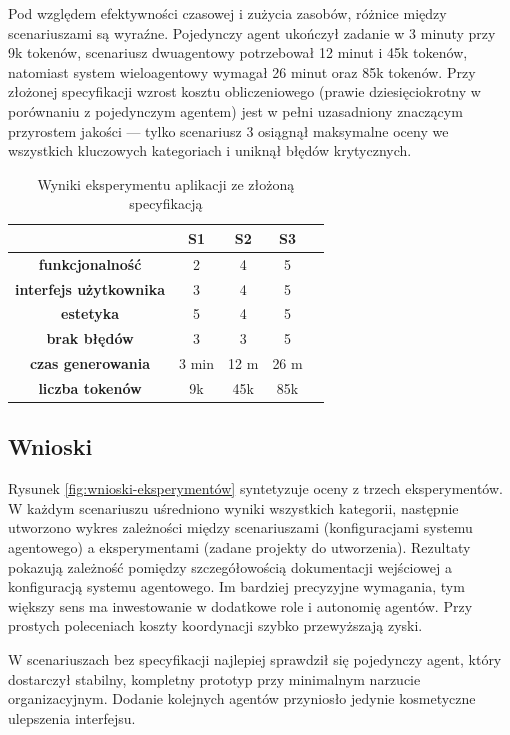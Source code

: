 Pod względem efektywności czasowej i zużycia zasobów, różnice między scenariuszami są wyraźne. Pojedynczy agent ukończył zadanie w 3 minuty przy 9k tokenów, scenariusz dwuagentowy potrzebował 12 minut i 45k tokenów, natomiast system wieloagentowy wymagał 26 minut oraz 85k tokenów. Przy złożonej specyfikacji wzrost kosztu obliczeniowego (prawie dziesięciokrotny w porównaniu z pojedynczym agentem) jest w pełni uzasadniony znaczącym przyrostem jakości — tylko scenariusz 3 osiągnął maksymalne oceny we wszystkich kluczowych kategoriach i uniknął błędów krytycznych.

\begin{table}[h!]
    \centering
    \begin{tabular}{|c|c|c|c|c|}
    \hline
    & \textbf{S1} & \textbf{S2} & \textbf{S3} \\
    \hline
    \textbf{funkcjonalność} & 2 & 4 & 5 \\
    \hline
    \textbf{interfejs użytkownika} & 3 & 4 & 5 \\
    \hline
    \textbf{estetyka} & 5 & 4 & 5 \\
    \hline
    \textbf{brak błędów} & 3 & 3 & 5 \\
    \hline
    \textbf{czas generowania} & 3 min & 12 m & 26 m \\
    \hline
    \textbf{liczba tokenów} & 9k & 45k & 85k \\
    \hline
    \end{tabular}
    \caption{Wyniki eksperymentu aplikacji ze złożoną specyfikacją}
    \label{table:eksperyment-z-zaawansowana-specyfikacja-aplikacji}
\end{table}

\subsection{Wnioski}
Rysunek \ref{fig:wnioski-eksperymentów} syntetyzuje oceny z trzech eksperymentów. W każdym scenariuszu uśredniono wyniki wszystkich kategorii, następnie utworzono wykres zależności między scenariuszami (konfiguracjami systemu agentowego) a eksperymentami (zadane projekty do utworzenia). Rezultaty pokazują zależność pomiędzy szczegółowością dokumentacji wejściowej a konfiguracją systemu agentowego. Im bardziej precyzyjne wymagania, tym większy sens ma inwestowanie w dodatkowe role i autonomię agentów. Przy prostych poleceniach koszty koordynacji szybko przewyższają zyski.

W scenariuszach bez specyfikacji najlepiej sprawdził się pojedynczy agent, który dostarczył stabilny, kompletny prototyp przy minimalnym narzucie organizacyjnym. Dodanie kolejnych agentów przyniosło jedynie kosmetyczne ulepszenia interfejsu.

